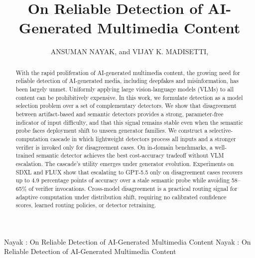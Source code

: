 \documentclass{ieeeaccess}
\begin{document}


\title{On Reliable Detection of AI-Generated Multimedia Content}
\author{\uppercase{Ansuman Nayak}, and 
\uppercase{Vijay K. Madisetti}, }

\address[1]{College of Computing, Georgia Institute of Technology, Atlanta, GA 30332 USA (e-mail: anayak306@gatech.edu)}
\address[2]{School of Cybersecurity and Privacy, Georgia Institute of Technology, Atlanta, GA 30332 USA (e-mail: vkm@gatech.edu)}

\markboth
{Nayak \headeretal: On Reliable Detection of AI-Generated Multimedia Content}
{Nayak \headeretal: On Reliable Detection of AI-Generated Multimedia Content}





\begin{abstract}
With the rapid proliferation of AI-generated multimedia content, the growing need for reliable detection of AI-generated media, including deepfakes and misinformation, has been largely unmet. Uniformly applying large vision-language models (VLMs) to all content can be prohibitively expensive. In this work, we formulate detection as a model selection problem over a set of complementary detectors. We show that disagreement between artifact-based and semantic detectors provides a strong, parameter-free indicator of input difficulty, and that this signal remains stable even when the semantic probe faces deployment shift to unseen generator families. We construct a selective-computation cascade in which lightweight detectors process all inputs and a stronger verifier is invoked only for disagreement cases. On in-domain benchmarks, a well-trained semantic detector achieves the best cost-accuracy tradeoff without VLM escalation. The cascade's utility emerges under generator evolution. Experiments on SDXL and FLUX show that escalating to GPT-5.5 only on disagreement cases recovers up to 4.9 percentage points of accuracy over a stale semantic probe while avoiding 58--65\% of verifier invocations. Cross-model disagreement is a practical routing signal for adaptive computation under distribution shift, requiring no calibrated confidence scores, learned routing policies, or detector retraining.

\end{abstract}
\end{document}

